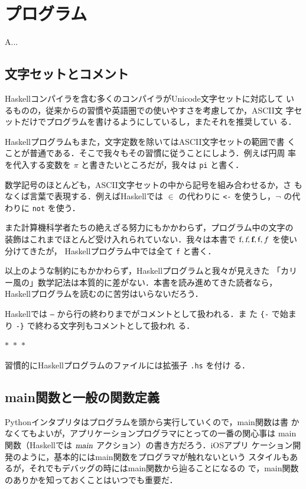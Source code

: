 \documentclass[a5paper,twoside,fleqn,draft]{jsbook}
\newcommand{\separator}{\begin{center}$*$~$*$~$*$\end{center}}
\newcommand{\programminglanguage}[1]{\textsf{#1}}
\newcommand{\haskell}{\programminglanguage{Haskell}}
\newcommand{\python}{\programminglanguage{Python}}
\newenvironment{leader}{\begingroup\gt}{\endgroup}
\newcommand{\code}[1]{\texttt{#1}}
\newcommand{\filename}[1]{\texttt{#1}}
\newcommand{\mAction}[1]{\textsl{#1}}
\DeclareMathOperator{\mMain}{\mAction{main}}
\DeclareMathOperator{\mFrom}{\in}
\begin{document}
\chapter{プログラム}

\begin{leader}
A...
\end{leader}


\section{文字セットとコメント}

\haskell コンパイラを含む多くのコンパイラがUnicode文字セットに対応して
いるものの，従来からの習慣や英語圏での使いやすさを考慮してか，ASCII文
字セットだけでプログラムを書けるようにしているし，またそれを推奨してい
る．

\haskell プログラムもまた，文字定数を除いてはASCII文字セットの範囲で書
くことが普通である．そこで我々もその習慣に従うことにしよう．例えば円周
率を代入する変数を $\pi$ と書きたいところだが，我々は \code{pi} と書く．

数学記号のほとんども，ASCII文字セットの中から記号を組み合わせるか，さ
もなくば言葉で表現する．例えば\haskell では $\mFrom$ の代わりに
\code{<-} を使うし，$\neg$ の代わりに \code{not} を使う．

また計算機科学者たちの絶えざる努力にもかかわらず，プログラム中の文字の
装飾はこれまでほとんど受け入れられていない．我々は本書で
$\textrm{f},\textsl{f},\textbf{f},\textsf{f},f$ を使い分けてきたが，
\haskell プログラム中では全て \code{f} と書く．

以上のような制約にもかかわらず，\haskell プログラムと我々が見えきた
「カリー風の」数学記法は本質的に差がない．本書を読み進めてきた読者なら，
\haskell プログラムを読むのに苦労はいらないだろう．

\haskell では \code{--} から行の終わりまでがコメントとして扱われる．ま
た \code{\{-} で始まり \code{-\}} で終わる文字列もコメントとして扱われ
る．

\separator

習慣的に\haskell プログラムのファイルには拡張子 \filename{.hs} を付け
る．

\section{main関数と一般の関数定義}

\python インタプリタはプログラムを頭から実行していくので，main関数は書
かなくてもよいが，アプリケーションプログラマにとっての一番の関心事は
main関数（\haskell では $\mMain$ アクション）の書き方だろう．iOSアプリ
ケーション開発のように，基本的にはmain関数をプログラマが触れないという
スタイルもあるが，それでもデバッグの時にはmain関数から辿ることになるの
で，main関数のありかを知っておくことはいつでも重要だ．
\end{document}
